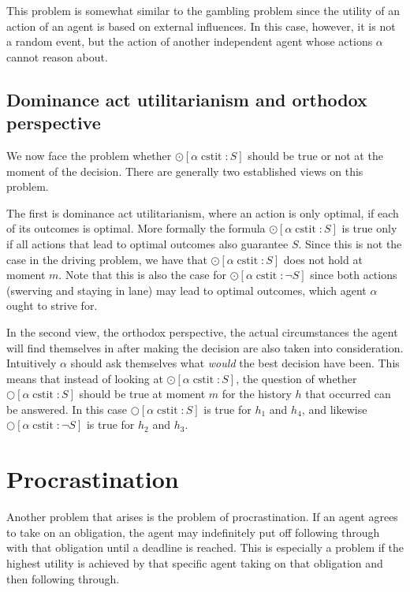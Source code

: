 \documentclass{article}
\newcommand{\cstit}{\operatorname{cstit}}
\begin{document}
This problem is somewhat similar to the gambling problem since the utility of an action of an agent is based on external influences. In this case, however, it is not a random event, but the action of another independent agent whose actions $\alpha$ cannot reason about. 

\subsection{Dominance act utilitarianism and orthodox perspective}
We now face the problem whether $\odot [\alpha \cstit \colon S]$ should be true or not at the moment of the decision. There are generally two established views on this problem.

The first is dominance act utilitarianism, where an action is only optimal, if each of its outcomes is optimal. More formally the formula $\odot [\alpha \cstit \colon S]$ is true only if all actions that lead to optimal outcomes also guarantee $S$. Since this is not the case in the driving problem, we have that $\odot [\alpha \cstit \colon S]$ does not hold at moment $m$. Note that this is also the case for $\odot [\alpha \cstit \colon \lnot S]$ since both actions (swerving and staying in lane) may lead to optimal outcomes, which agent $\alpha$ ought to strive for.

In the second view, the orthodox perspective, the actual circumstances the agent will find themselves in after making the decision are also taken into consideration. Intuitively $\alpha$ should ask themselves what \emph{would} the best decision have been. This means that instead of looking at $\odot [\alpha \cstit \colon S]$, the question of whether $\bigcirc [\alpha \cstit \colon S]$ should be true at moment $m$ for the history $h$ that occurred can be answered. In this case $\bigcirc [\alpha \cstit \colon S]$ is true for $h_1$ and $h_4$, and likewise $\bigcirc [\alpha \cstit \colon \lnot S]$ is true for $h_2$ and $h_3$.

\section{Procrastination}
Another problem that arises is the problem of procrastination. If an agent agrees to take on an obligation, the agent may indefinitely put off following through with that obligation until a deadline is reached. This is especially a problem if the highest utility is achieved by that specific agent taking on that obligation and then following through.
\end{document}

